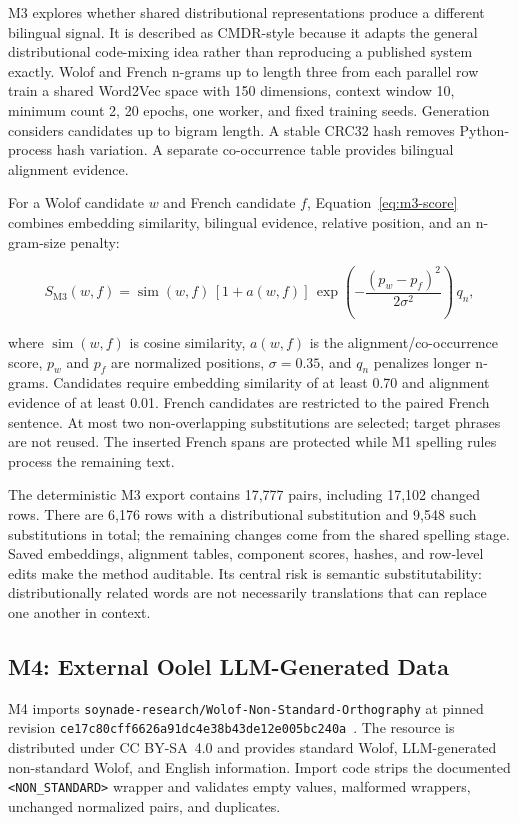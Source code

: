 \documentclass[12pt, a4paper, twoside, openany]{report}
\begin{document}
M3 explores whether shared distributional representations produce a different bilingual signal. It is described as CMDR-style because it adapts the general distributional code-mixing idea rather than reproducing a published system exactly. Wolof and French n-grams up to length three from each parallel row train a shared Word2Vec space with 150 dimensions, context window 10, minimum count 2, 20 epochs, one worker, and fixed training seeds. Generation considers candidates up to bigram length. A stable CRC32 hash removes Python-process hash variation. A separate co-occurrence table provides bilingual alignment evidence.

For a Wolof candidate $w$ and French candidate $f$, Equation~\eqref{eq:m3-score} combines embedding similarity, bilingual evidence, relative position, and an n-gram-size penalty:

\begin{equation}
	S_{\mathrm{M3}}(w,f)=
	\operatorname{sim}(w,f)\,[1+a(w,f)]\,
	\exp\!\left(-\frac{(p_w-p_f)^2}{2\sigma^2}\right)\,q_n,
	\label{eq:m3-score}
\end{equation}

where $\operatorname{sim}(w,f)$ is cosine similarity, $a(w,f)$ is the alignment/co-occurrence score, $p_w$ and $p_f$ are normalized positions, $\sigma=0.35$, and $q_n$ penalizes longer n-grams. Candidates require embedding similarity of at least 0.70 and alignment evidence of at least 0.01. French candidates are restricted to the paired French sentence. At most two non-overlapping substitutions are selected; target phrases are not reused. The inserted French spans are protected while M1 spelling rules process the remaining text.

The deterministic M3 export contains 17,777 pairs, including 17,102 changed rows. There are 6,176 rows with a distributional substitution and 9,548 such substitutions in total; the remaining changes come from the shared spelling stage. Saved embeddings, alignment tables, component scores, hashes, and row-level edits make the method auditable. Its central risk is semantic substitutability: distributionally related words are not necessarily translations that can replace one another in context.


\subsection{M4: External Oolel LLM-Generated Data}

M4 imports \texttt{soynade-research/Wolof-Non-Standard-Orthography} at pinned revision \texttt{ce17c80cff6626a91dc4e38b43de12e005bc240a}~\cite{soynade2026dataset}. The resource is distributed under CC BY-SA~4.0 and provides standard Wolof, LLM-generated non-standard Wolof, and English information. Import code strips the documented \texttt{<NON\_STANDARD>} wrapper and validates empty values, malformed wrappers, unchanged normalized pairs, and duplicates.
\end{document}
